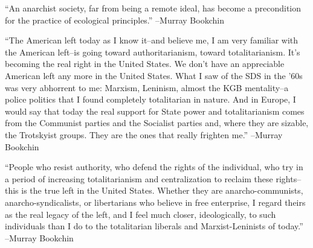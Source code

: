 \documentclass{article}%
\begin{document}
\linebreak%
\vspace{1mm}%
\begin{minipage}{\textwidth}%
\flushleft%
“An anarchist society, far from being a remote ideal, has become a precondition for the practice of ecological principles.”%
\linebreak%
\vspace{1mm}%
–Murray Bookchin%
\linebreak%
\vspace{1mm}%
\end{minipage}%
\linebreak%
\vspace{1mm}%
\begin{minipage}{\textwidth}%
\flushleft%
“The American left today as I know it–and believe me, I am very familiar with the American left–is going toward authoritarianism, toward totalitarianism. It's becoming the real right in the United States. We don't have an appreciable American left any more in the United States. What I saw of the SDS in the '60s was very abhorrent to me: Marxism, Leninism, almost the KGB mentality–a police politics that I found completely totalitarian in nature. And in Europe, I would say that today the real support for State power and totalitarianism comes from the Communist parties and the Socialist parties and, where they are sizable, the Trotskyist groups. They are the ones that really frighten me.”%
\linebreak%
\vspace{1mm}%
–Murray Bookchin%
\linebreak%
\vspace{1mm}%
\end{minipage}%
\linebreak%
\vspace{1mm}%
\begin{minipage}{\textwidth}%
\flushleft%
“People who resist authority, who defend the rights of the individual, who try in a period of increasing totalitarianism and centralization to reclaim these rights–this is the true left in the United States. Whether they are anarcho{-}communists, anarcho{-}syndicalists, or libertarians who believe in free enterprise, I regard theirs as the real legacy of the left, and I feel much closer, ideologically, to such individuals than I do to the totalitarian liberals and Marxist{-}Leninists of today.”%
\linebreak%
\vspace{1mm}%
–Murray Bookchin%
\linebreak%
\vspace{1mm}%
\end{minipage}%
\end{document}
